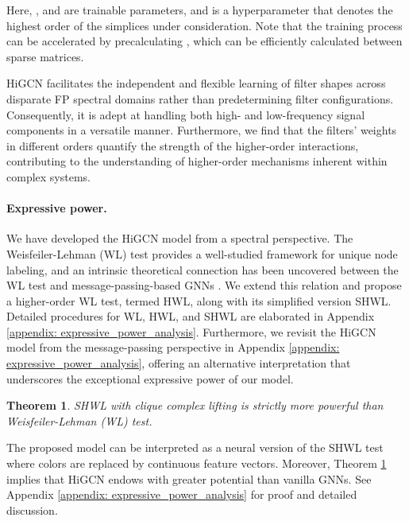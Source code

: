 \documentclass[letterpaper]{article} \usepackage{aaai24}
\theoremstyle{plain}
\newtheorem{theorem}{Theorem}[section]
\theoremstyle{definition}
\theoremstyle{remark}
\begin{document}
Here, , and  are trainable parameters, and  is a hyperparameter that denotes the highest order of the simplices under consideration. 
Note that the training process can be accelerated by precalculating , which can be efficiently calculated between sparse matrices. 



HiGCN facilitates the independent and flexible learning of filter shapes across disparate FP spectral domains rather than predetermining filter configurations. 
Consequently, it is adept at handling both high- and low-frequency signal components in a versatile manner. 
Furthermore, we find that the filters' weights in different orders quantify the strength of the higher-order interactions, contributing to the understanding of higher-order mechanisms inherent within complex systems.







\paragraph{Expressive power.}

We have developed the HiGCN model from a spectral perspective. 
The Weisfeiler-Lehman (WL) test \cite{WLtest} provides a well-studied framework for unique node labeling, and an intrinsic theoretical connection has been uncovered between the WL test and message-passing-based GNNs \cite{GIN2019, kWL2019}. 
We extend this relation and propose a higher-order WL test, termed HWL, along with its simplified version SHWL. 
Detailed procedures for WL, HWL, and SHWL are elaborated in Appendix \ref{appendix: expressive_power_analysis}.
Furthermore, we revisit the HiGCN model from the message-passing perspective in Appendix  \ref{appendix: expressive_power_analysis}, offering an alternative interpretation that underscores the exceptional expressive power of our model.









\begin{theorem}
\label{the:SHWL}
SHWL with clique complex lifting is strictly more powerful than Weisfeiler-Lehman (WL) test.
\end{theorem}







The proposed model can be interpreted as a neural version of the SHWL test where colors are replaced by continuous feature vectors.
Moreover, Theorem \ref{the:SHWL} implies that HiGCN endows with greater potential than vanilla GNNs. See Appendix \ref{appendix: expressive_power_analysis} for proof and detailed discussion.
\end{document}
